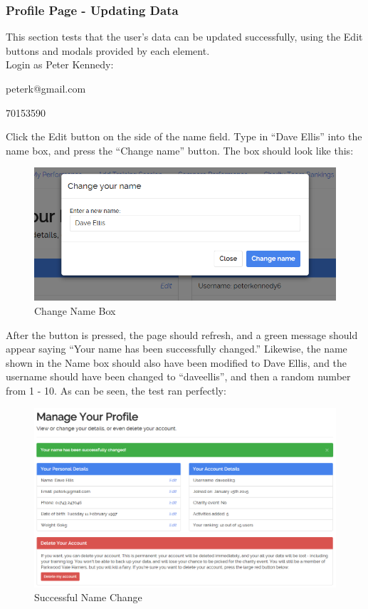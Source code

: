 \documentclass{article}[12pt,a4paper]
\begin{document}
{\clearpage

\subsubsection{Profile Page - Updating Data}
This section tests that the user's data can be updated successfully, using the Edit buttons and modals provided by each element.\\

Login as Peter Kennedy:

\begin{description}[labelindent=1cm]
  \item[Email:] peterk@gmail.com
  \item[Password:] 70153590
\end{description}

Click the Edit button on the side of the name field. Type in ``Dave Ellis'' into the name box, and press the ``Change name'' button. The box should look like this:

\begin{figure}[h!]
    \includegraphics[scale=0.33]{images/testing/profile/change_name}
    \caption{Change Name Box}
\end{figure}

After the button is pressed, the page should refresh, and a green message should appear saying ``Your name has been successfully changed.'' Likewise, the name shown in the Name box should also have been modified to Dave Ellis, and the username should have been changed to ``daveellis'', and then a random number from 1 - 10. As can be seen, the test ran perfectly:

\begin{figure}[h!]
    \includegraphics[scale=0.31]{images/testing/profile/change_name_success}
    \caption{Successful Name Change}
\end{figure}

}
\end{document}
